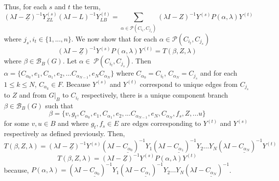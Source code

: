 \documentclass{paper}
\begin{document}
Thus, for each $s$ and $t$ the term,
\[
(\lambda	I - \underline{Z})^{-1}Y_{ZL}^{(s)} (\lambda I - L)^{-1}Y_{LB}^{(t)}
=
\sum_{\alpha \in \mathcal{P}(C_{i_t},C_{j_s})}(\lambda	I - Z)^{-1}Y^{(s)} P(\alpha,\lambda) Y^{(t)}
\]
where $j_s, i_t \in \{1,...,n\}$. We now show that for each $\alpha \in \mathcal{P}(C_{i_t},C_{j_s})$
\[
(\lambda	I - \underline{Z})^{-1}Y^{(s)} P(\alpha,\lambda) Y^{(t)}
=
T(\beta,Z, \lambda)
\]
where $\beta \in \mathcal{B}_B(G)$. Let $\alpha \in \ \mathcal{P}(C_{i_t},C_{j_s})$. 
Then $\alpha = \{C_{\alpha_0}, e_1, C_{\alpha_1}, e_2, ... C_{\alpha_{N-1}}, e_{N} C_{\alpha_N} \} $ 
where $C_{\alpha_0} =C_{i_t}$, $C_{\alpha_N} = C_{j_s}$ and for each $1 \leq k \leq N$, $C_{\alpha_k} \in F$. 
Because $Y^{(s)}$ and $Y^{(t)}$ correspond to unique edges from $C_{j_s}$ to $Z$ and from $G|_B$ to $C_{i_t}$ respectively, there is a unique component branch $\beta \in \mathcal{B}_B(G)$ such that 
\[
\beta 
= 
\{v,g_t,  C_{\alpha_0}, e_1, C_{\alpha_1}, e_2, ... C_{\alpha_{N-1}}, e_N, C_{\alpha_N}, f_s, Z, ... u \}
\]
 for some $v,u \in B$ and where $g_t, f_s \in E$ are edges corresponding to $Y^{(t)}$ and $Y^{(s)}$ respectively as defined previously. 
Then,
\[
T(\beta,Z, \lambda)
=
(\lambda I -\underline{Z})^{-1} Y^{(s)} (\lambda I -\underline{C_{\alpha_0}})^{-1} Y_1 (\lambda I -\underline{C_{\alpha_1}})^{-1} Y_2 ... Y_N (\lambda I -\underline{C_{\alpha_N}})^{-1} Y^{(t)}
\]
\[
T(\beta,Z, \lambda)
=
(\lambda	I - \underline{Z})^{-1}Y^{(s)} P(\alpha,\lambda) Y^{(t)}
\]
because, $P(\alpha,\lambda) = (\lambda I -\underline{C_{\alpha_0}})^{-1} Y_1 (\lambda I -\underline{C_{\alpha_1}})^{-1} Y_2 ... Y_N (\lambda I -\underline{C_{\alpha_N}})^{-1}$. 
\end{document}
